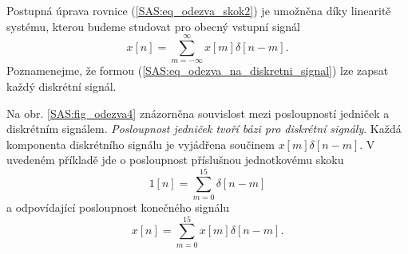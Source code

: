       Postupná úprava rovnice (\ref{SAS:eq_odezva_skok2}) je umožněna díky linearitě systému,
      kterou budeme studovat pro obecný vstupní signál
      \begin{equation}\label{SAS:eq_odezva_na_diskretni_signal}
        x[n]=\sum_{m=-\infty}^\infty x[m]\delta[n-m].
      \end{equation}
      Poznamenejme, že formou (\ref{SAS:eq_odezva_na_diskretni_signal}) lze zapsat každý diskrétní
      signál.
     
      
      
      Na obr. \ref{SAS:fig_odezva4} znázorněna souvislost mezi posloupností jedniček a diskrétním
      sig\-ná\-lem. \emph{Posloupnost jedniček tvoří bázi pro diskrétní signály}. Každá komponenta
      diskrétního signálu je vyjádřena součinem $x[m]\delta[n-m]$. V uvedeném příkladě jde o
      posloupnost příslušnou jednotkovému skoku
      \begin{equation}\label{SAS:eq_odezva5}
        1[n]=\sum_{m=0}^{15}\delta[n-m]
      \end{equation}
      a odpovídající posloupnost konečného signálu
      \begin{equation}\label{SAS:eq_odezva6}
        x[n]=\sum_{m=0}^{15}x[m]\delta[n-m].
      \end{equation}
  
